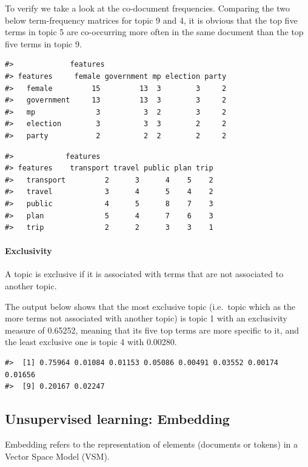 \documentclass[
]{article}
\begin{document}
To verify we take a look at the co-document frequencies. Comparing the
two below term-frequency matrices for topic 9 and 4, it is obvious that
the top five terms in topic 5 are co-occurring more often in the same
document than the top five terms in topic 9.

\begin{verbatim}
#>             features
#> features     female government mp election party
#>   female         15         13  3        3     2
#>   government     13         13  3        3     2
#>   mp              3          3  2        3     2
#>   election        3          3  3        2     2
#>   party           2          2  2        2     2
\end{verbatim}

\begin{verbatim}
#>            features
#> features    transport travel public plan trip
#>   transport         2      3      4    5    2
#>   travel            3      4      5    4    2
#>   public            4      5      8    7    3
#>   plan              5      4      7    6    3
#>   trip              2      2      3    3    1
\end{verbatim}

\hypertarget{exclusivity}{%
\paragraph{Exclusivity}\label{exclusivity}}

A topic is exclusive if it is associated with terms that are not
associated to another topic.

The output below shows that the most exclusive topic (i.e.~topic which
as the more terms not associated with another topic) is topic 1 with an
exclusivity measure of 0.65252, meaning that its five top terms are more
specific to it, and the least exclusive one is topic 4 with 0.00280.

\begin{verbatim}
#>  [1] 0.75964 0.01084 0.01153 0.05086 0.00491 0.03552 0.00174 0.01656
#>  [9] 0.20167 0.02247
\end{verbatim}

\hypertarget{unsupervised-learning-embedding}{%
\subsection{Unsupervised learning:
Embedding}\label{unsupervised-learning-embedding}}

Embedding refers to the representation of elements (documents or tokens)
in a Vector Space Model (VSM).
\end{document}
